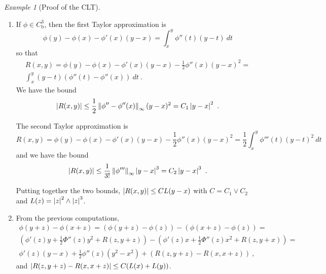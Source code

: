 \documentclass[12pt,a4paper]{amsart}
\theoremstyle{plain}%
\theoremstyle{definition}
\theoremstyle{remark}
\newtheorem{example}{Example}
\begin{document}
\begin{example}[Proof of the CLT]
  \begin{enumerate}
  \item If $\phi \in C^3_{\text{b}}$, then the first Taylor approximation is
    \begin{equation*}
      \phi(y) - \phi(x) - \phi'(x)(y-x) = \int_x^y \phi''(t)(y-t) \ dt 
    \end{equation*}
so that
\begin{multline*}
      R(x,y) = \phi(y) - \phi(x) - \phi'(x)(y-x) -\frac12 \phi''(x)(y-x)^2 = \\ \int_x^y (y-t)(\phi''(t) - \phi''(x)) \ dt \ . 
    \end{multline*}
 We have the bound
 \begin{equation*}
   \left\vert R(x,y)\right\vert \leq \frac12 \left\Vert\phi'' - \phi''(x)\right\Vert_{\infty} (y-x)^2 = C_1 \left\vert y-x\right\vert^2\ .
 \end{equation*}

    The second Taylor approximation is
    \begin{equation*}
     R(x,y) = \phi(y) - \phi(x) - \phi'(x)(y-x) - \frac12 \phi''(x)(y-x)^2 = \frac1{2}\int_x^y \phi'''(t)(y-t)^2 \ dt 
   \end{equation*}
and we have the bound
\begin{equation*}
  \aval{R(x,y)} \leq \frac1{3!} \normat \infty {\phi'''}  \aval{y-x}^3 = C_2 \aval{y-x}^3 \ .
\end{equation*}

Putting together the two bounds, $\left\vert R(x,y)\right\vert \leq C L(y-x)$ with $C = C_1 \vee C_2$ and $L(z) = \left\vert z\right\vert^2 \wedge \left\vert z\right\vert^3$.

\item 
  From the previous computations,
  \begin{multline*}
\phi(y+z) - \phi(x+z) = (\phi(y+z) - \phi(z)) - (\phi(x+z) - \phi(z)) = \\
   \left(\phi'(z)y + \frac12 \Phi''(z)y^2 + R(z,y+z)\right) - \left(\phi'(z)x + \frac12 \Phi''(z)x^2 + R(z,y+x)\right) = \\
   \phi'(z)(y-x) + \frac12 \phi''(z)(y^2-x^2) + \left(R(z,y+z) - R(x,x+z)\right) \ ,
 \end{multline*}
 and $\left\vert R(z,y+z) - R(x,x+z)\right\vert \leq C(L(x) + L(y))$.


\end{enumerate}
\end{example}
\end{document}
